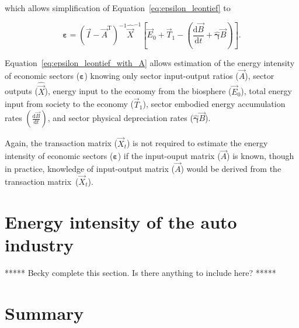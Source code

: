 \noindent{}which allows simplification 
of Equation~\ref{eq:epsilon_leontief} to

\begin{equation} \label{eq:epsilon_leontief_with_A}
	\bm{\varepsilon} 
	= {(\vec{I} - \vec{A}^{\mathrm{T}})}^{-1}\hat{\vec{X}}^{-1}
		\left[\vec{E}_{0} 
				+ \vec{T}_{1} 
				- \left(\frac{\mathrm{d}\vec{B}}{\mathrm{d}t} 
				+ \hat{\bm{\gamma}}\vec{B}\right)
		\right].
\end{equation}

\noindent{}Equation~\ref{eq:epsilon_leontief_with_A} allows estimation 
of the energy intensity 
of economic sectors ($\bm{\varepsilon}$) 
knowing only 
sector input-output ratios ($\vec{A}$), 
sector outputs ($\hat{\vec{X}}$), 
energy input to the economy from the biosphere ($\vec{E}_{0}$), 
total energy input from society to the economy ($\vec{T}_{1}$),
sector embodied energy accumulation rates $\left(\frac{\mathrm{d}\vec{B}}{\mathrm{d}t}\right)$,
and sector physical depreciation rates ($\hat{\bm{\gamma}}\vec{B}$).

Again, the transaction matrix ($\vec{X}_{t}$) is not required 
to estimate the energy intensity of economic sectors ($\bm{\varepsilon}$)
if the input-ouput matrix ($\vec{A}$) is known, 
though in practice, knowledge of input-output matrix ($\vec{A}$) 
would be derived from the transaction matrix~($\vec{X}_{t}$).


\section{Energy intensity of the auto industry}
\label{sec:intensity_auto}

***** Becky complete this section. Is there anything to include here? *****

\section{Summary}
\label{sec:intensity_summary}



